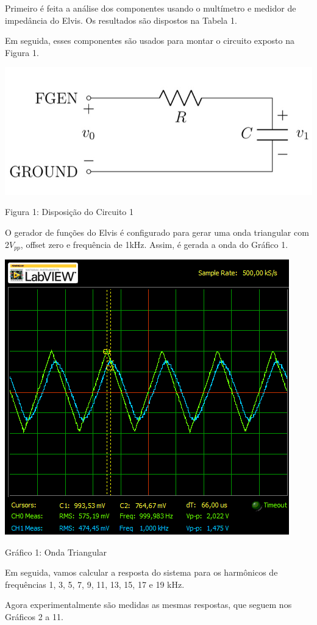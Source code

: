 \parag Primeiro é feita a análise dos componentes usando o multímetro e medidor de impedância do Elvis. Os resultados são dispostos na Tabela 1.



Em seguida, esses componentes são usados para montar o circuito exposto na Figura 1.

\begin{table}[h]
\centering
\includegraphics[scale=0.4]{figuras/figura1}
\end{table}
\begin{center}
Figura 1: Disposição do Circuito 1
\end{center}

O gerador de funções do Elvis é configurado para gerar uma onda triangular com 2$V_{pp}$, offset zero e frequência de 1kHz. Assim, é gerada a onda do Gráfico 1.

\begin{table}[h]
\centering
\includegraphics[scale=0.8]{graficos/rgadicoa1-triangulo}
\end{table}
\begin{center}
Gráfico 1: Onda Triangular
\end{center}


Em seguida, vamos calcular a resposta do sistema para os harmônicos de frequências 1, 3, 5, 7, 9, 11, 13, 15, 17 e 19 kHz.


Agora experimentalmente são medidas as mesmas respostas, que seguem nos Gráficos 2 a 11. 

